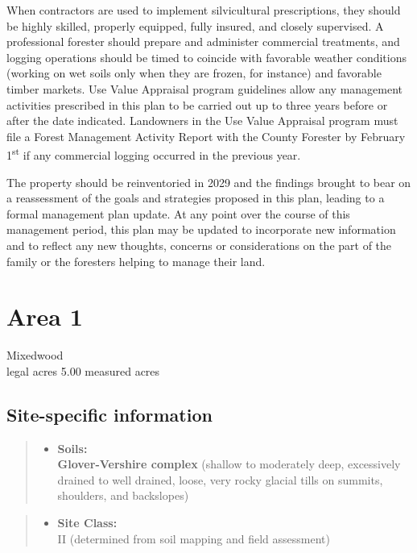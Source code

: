 \documentclass[]{tufte-handout}
\providecommand{\tightlist}{%
  \setlength{\itemsep}{0pt}\setlength{\parskip}{0pt}}
\begin{document}
When contractors are used to implement silvicultural prescriptions, they
should be highly skilled, properly equipped, fully insured, and closely
supervised. A professional forester should prepare and administer
commercial treatments, and logging operations should be timed to
coincide with favorable weather conditions (working on wet soils only
when they are frozen, for instance) and favorable timber markets. Use
Value Appraisal program guidelines allow any management activities
prescribed in this plan to be carried out up to three years before or
after the date indicated. Landowners in the Use Value Appraisal program
must file a Forest Management Activity Report with the County Forester
by February 1\textsuperscript{st} if any commercial logging occurred in
the previous year.

The property should be reinventoried in 2029 and the findings brought to
bear on a reassessment of the goals and strategies proposed in this
plan, leading to a formal management plan update. At any point over the
course of this management period, this plan may be updated to
incorporate new information and to reflect any new thoughts, concerns or
considerations on the part of the family or the foresters helping to
manage their land.

\newpage

\section{Area 1}\label{area-1}

Mixedwood\\
 legal acres \textbar{} 5.00 measured acres

\subsection{Site-specific information}\label{site-specific-information}

\begin{quote}
\begin{itemize}
\tightlist
\item
  \textbf{Soils:}\\
  \indent\indent  \textbf{Glover-Vershire complex} (shallow to
  moderately deep, excessively drained to well drained, loose, very
  rocky glacial tills on summits, shoulders, and backslopes)
\end{itemize}
\end{quote}

\begin{quote}
\begin{itemize}
\tightlist
\item
  \textbf{Site Class:}\\
  \vspace{2pt} II (determined from soil mapping and field assessment)
\end{itemize}
\end{quote}
\end{document}

